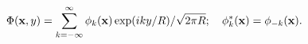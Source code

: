 \begin{equation}
 \Phi({\bf{x}},y)=\sum_{k=-\infty}^\infty \phi_k({\bf{x}})
 \exp(iky/R)/\sqrt{2\pi R}; \quad \phi_k^*({\bf{x}}) = \phi_{-k}({\bf{x}}).
\end{equation}

